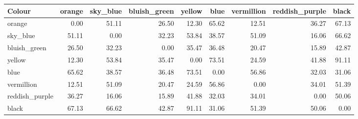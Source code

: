 \begin{tabular}{lrrrrrrrr}
\toprule
Colour & orange & sky\_blue & bluish\_green & yellow & blue & vermillion & reddish\_purple & black \\
\midrule
orange & 0.00 & 51.11 & 26.50 & 12.30 & 65.62 & 12.51 & 36.27 & 67.13 \\
sky\_blue & 51.11 & 0.00 & 32.23 & 53.84 & 38.57 & 51.09 & 16.06 & 66.62 \\
bluish\_green & 26.50 & 32.23 & 0.00 & 35.47 & 36.48 & 20.47 & 15.89 & 42.87 \\
yellow & 12.30 & 53.84 & 35.47 & 0.00 & 73.51 & 24.59 & 41.88 & 91.11 \\
blue & 65.62 & 38.57 & 36.48 & 73.51 & 0.00 & 56.86 & 32.03 & 31.06 \\
vermillion & 12.51 & 51.09 & 20.47 & 24.59 & 56.86 & 0.00 & 34.01 & 51.39 \\
reddish\_purple & 36.27 & 16.06 & 15.89 & 41.88 & 32.03 & 34.01 & 0.00 & 50.06 \\
black & 67.13 & 66.62 & 42.87 & 91.11 & 31.06 & 51.39 & 50.06 & 0.00 \\
\bottomrule
\end{tabular}
